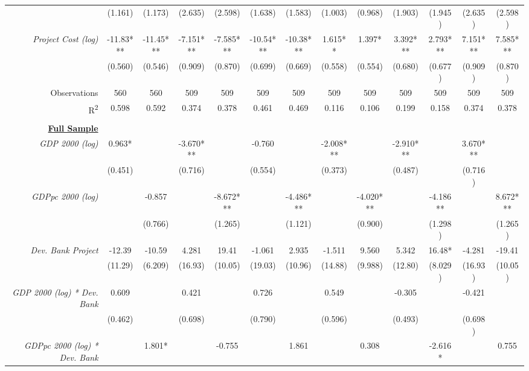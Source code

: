 \documentclass{article}
\begin{document}
\begin{singlespace}
\begin{landscape}
\begin{table}[H]
{\begin{tabular}{rcccccccccccc}
					\textit{} & (1.161) & (1.173) & (2.635) & (2.598) & (1.638) & (1.583) & (1.003) & (0.968) & (1.903) & (1.945) & (2.635) & (2.598) \\
					\textit{Project Cost (log)} & -11.83*** & -11.45*** & -7.151*** & -7.585*** & -10.54*** & -10.38*** & 1.615** & 1.397* & 3.392*** & 2.793*** & 7.151*** & 7.585*** \\
					\textit{} & (0.560) & (0.546) & (0.909) & (0.870) & (0.699) & (0.669) & (0.558) & (0.554) & (0.680) & (0.677) & (0.909) & (0.870) \\ \hline
					Observations & 560 & 560 & 509 & 509 & 509 & 509 & 509 & 509 & 509 & 509 & 509 & 509 \\
					R\textsuperscript{2} & 0.598 & 0.592 & 0.374 & 0.378 & 0.461 & 0.469 & 0.116 & 0.106 & 0.199 & 0.158 & 0.374 & 0.378 \\ \hline
					\multicolumn{1}{l}{\textit{}} & \multicolumn{1}{l}{} & \multicolumn{1}{l}{} & \multicolumn{1}{l}{} & \multicolumn{1}{l}{} & \multicolumn{1}{l}{} & \multicolumn{1}{l}{} & \multicolumn{1}{l}{} & \multicolumn{1}{l}{} & \multicolumn{1}{l}{} & \multicolumn{1}{l}{} & \multicolumn{1}{l}{} & \multicolumn{1}{l}{} \\
					{\ul \textbf{Full Sample}} &  &  &  &  &  &  &  &  &  &  &  &  \\
					\textit{GDP 2000 (log)} & 0.963* &  & -3.670*** &  & -0.760 &  & -2.008*** &  & -2.910*** &  & 3.670*** &  \\
					\textit{} & (0.451) &  & (0.716) &  & (0.554) &  & (0.373) &  & (0.487) &  & (0.716) &  \\
					\textit{GDPpc 2000 (log)} &  & -0.857 &  & -8.672*** &  & -4.486*** &  & -4.020*** &  & -4.186** &  & 8.672*** \\
					\textit{} &  & (0.766) &  & (1.265) &  & (1.121) &  & (0.900) &  & (1.298) &  & (1.265) \\
					\textit{Dev. Bank Project} & -12.39 & -10.59 & 4.281 & 19.41 & -1.061 & 2.935 & -1.511 & 9.560 & 5.342 & 16.48* & -4.281 & -19.41 \\
					\textit{} & (11.29) & (6.209) & (16.93) & (10.05) & (19.03) & (10.96) & (14.88) & (9.988) & (12.80) & (8.029) & (16.93) & (10.05) \\
					\textit{GDP 2000 (log) * Dev. Bank} & 0.609 &  & 0.421 &  & 0.726 &  & 0.549 &  & -0.305 &  & -0.421 &  \\
					\textit{} & (0.462) &  & (0.698) &  & (0.790) &  & (0.596) &  & (0.493) &  & (0.698) &  \\
					\textit{GDPpc 2000 (log) * Dev. Bank} &  & 1.801* &  & -0.755 &  & 1.861 &  & 0.308 &  & -2.616* &  & 0.755 \\

\end{tabular}}
\end{table}
\end{landscape}
\end{singlespace}
\end{document}
